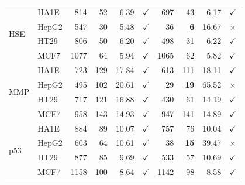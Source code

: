 \documentclass[11pt,a4paper]{article}
\begin{document}
\begin{landscape}
\begin{table}[p]
\begin{tabular*}{\linewidth}{@{\extracolsep{\fill}}ll|rrrcrrrc@{}}
\midrule
\multirow[c]{4}{*}{HSE} & HA1E & 814 & 52 & 6.39 & \(\checkmark\) & 697 & 43 & 6.17 & \(\checkmark\) \\
 & HepG2 & 547 & 30 & 5.48 & \(\checkmark\) & 36 & \textbf{6} & 16.67 & \(\times\) \\
 & HT29 & 806 & 50 & 6.20 & \(\checkmark\) & 498 & 31 & 6.22 & \(\checkmark\) \\
 & MCF7 & 1077 & 64 & 5.94 & \(\checkmark\) & 1065 & 62 & 5.82 & \(\checkmark\) \\
\midrule
\multirow[c]{4}{*}{MMP} & HA1E & 723 & 129 & 17.84 & \(\checkmark\) & 613 & 111 & 18.11 & \(\checkmark\) \\
 & HepG2 & 495 & 102 & 20.61 & \(\checkmark\) & 29 & \textbf{19} & 65.52 & \(\times\) \\
 & HT29 & 717 & 121 & 16.88 & \(\checkmark\) & 430 & 61 & 14.19 & \(\checkmark\) \\
 & MCF7 & 958 & 143 & 14.93 & \(\checkmark\) & 947 & 141 & 14.89 & \(\checkmark\) \\
\midrule
\multirow[c]{4}{*}{p53} & HA1E & 884 & 89 & 10.07 & \(\checkmark\) & 757 & 76 & 10.04 & \(\checkmark\) \\
 & HepG2 & 603 & 64 & 10.61 & \(\checkmark\) & 38 & \textbf{15} & 39.47 & \(\times\) \\
 & HT29 & 877 & 85 & 9.69 & \(\checkmark\) & 533 & 57 & 10.69 & \(\checkmark\) \\
 & MCF7 & 1158 & 100 & 8.64 & \(\checkmark\) & 1142 & 98 & 8.58 & \(\checkmark\) \\
\bottomrule
\end{tabular*}
\end{table}
\endgroup
\end{landscape}
\clearpage
\end{document}
